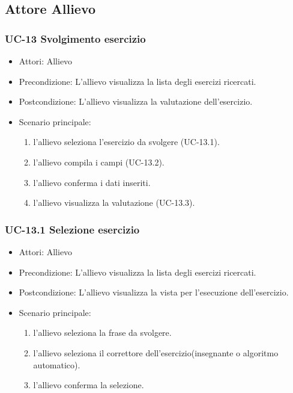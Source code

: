 					
					
					
\subsection{Attore Allievo}
	\subsubsection{UC-13 Svolgimento esercizio}
	\begin{itemize}
	\item Attori: Allievo
			\item Precondizione:  L'allievo visualizza la lista degli esercizi ricercati.
			\item Postcondizione: L'allievo visualizza la valutazione dell'esercizio.
			\item Scenario principale:
			\begin{enumerate}
				\item l'allievo seleziona l'esercizio da svolgere (UC-13.1).
				\item l'allievo compila i campi (UC-13.2).
				\item l'allievo conferma i dati inseriti.
				\item l'allievo visualizza la valutazione (UC-13.3).
			\end{enumerate}
	\end{itemize}
			
	\subsubsection{UC-13.1 Selezione esercizio}
	\begin{itemize}
			\item Attori: Allievo
			\item Precondizione: L'allievo visualizza la lista degli esercizi ricercati.
			\item Postcondizione: L'allievo visualizza la vista per l'esecuzione dell'esercizio.
			\item Scenario principale:
				\begin{enumerate}
					\item l'allievo seleziona la frase da svolgere.
					\item l'allievo seleziona il correttore dell'esercizio(insegnante o algoritmo automatico).
					\item l'allievo conferma la selezione.
				\end{enumerate}
			\end{itemize}

